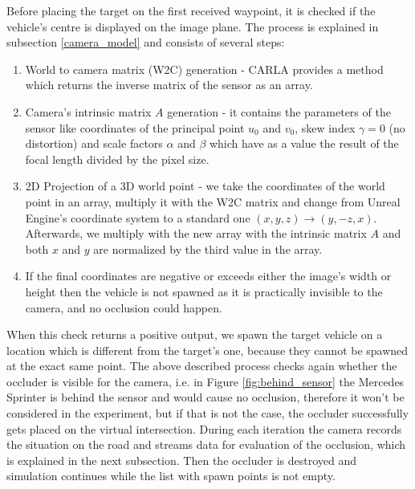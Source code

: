 Before placing the target on the first received waypoint, it is checked if the vehicle's centre is displayed on the image plane. The process is explained in subsection \ref{camera_model} and consists of several steps:
\begin{enumerate}
    \item World to camera matrix (W2C) generation - CARLA provides a method which returns the inverse matrix of the sensor as an array.
    \item Camera's intrinsic matrix $A$ generation - it contains the parameters of the sensor like coordinates of the principal point $u_0$ and $v_0$, skew index $\gamma=0$ (no distortion) and scale factors $\alpha$ and $\beta$ which have as a value the result of the focal length divided by the pixel size.
    \item 2D Projection of a 3D world point - we take the coordinates of the world point in an array, multiply it with the W2C matrix and change from Unreal Engine's coordinate system to a standard one $(x, y ,z) \rightarrow (y, -z, x)$. Afterwards, we multiply with the new array with the intrinsic matrix $A$ and both $x$ and $y$ are normalized by the third value in the array.
    \item If the final coordinates are negative or exceeds either the image's width or height then the vehicle is not spawned as it is practically invisible to the camera, and no occlusion could happen.
\end{enumerate}

When this check returns a positive output, we spawn the target vehicle on a location which is different from the target's one, because they cannot be spawned at the exact same point. The above described process checks again whether the occluder is visible for the camera, i.e. in Figure \ref{fig:behind_sensor} the Mercedes Sprinter is behind the sensor and would cause no occlusion, therefore it won't be considered in the experiment, but if that is not the case, the occluder successfully gets placed on the virtual intersection. During each iteration the camera records the situation on the road and streams data for evaluation of the occlusion, which is explained in the next subsection. Then the occluder is destroyed and simulation continues while the list with spawn points is not empty.

